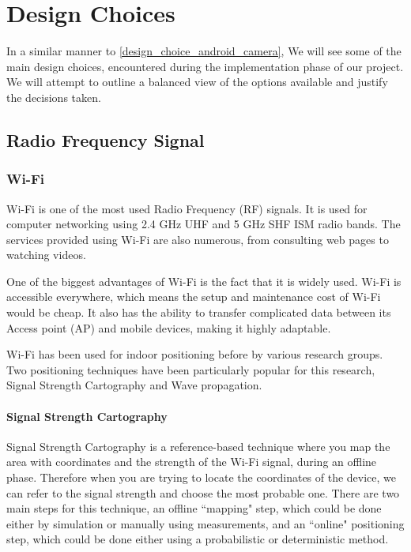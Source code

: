 

\section{Design Choices}
In a similar manner to \ref{design_choice_android_camera}, We will see some of the main design choices, encountered during the implementation phase of our project. We will attempt to outline a balanced view of the options available and justify the decisions taken.
\subsection{Radio Frequency Signal}

\subsubsection{Wi-Fi}

Wi-Fi is one of the most used Radio Frequency (RF) signals.
It is used for computer networking using 2.4 GHz UHF and 5 GHz SHF
ISM radio bands\cite{wifi-wikipedia}. The services provided using Wi-Fi are also
numerous, from consulting web pages to watching videos. 

One of the biggest advantages of Wi-Fi is the fact that it is
widely used. Wi-Fi is accessible everywhere, which means the setup and maintenance cost of Wi-Fi would be cheap. It also has the
ability to transfer complicated data between its Access point (AP)
and mobile devices, making it highly adaptable. 

Wi-Fi has been used for indoor positioning before by various research
groups\cite{wifi-indoor}. Two positioning techniques have been particularly popular for this research, Signal Strength Cartography and Wave propagation. 

\paragraph{Signal Strength Cartography}
Signal Strength Cartography\cite{sig-cart} is a reference-based technique where you map the area
with coordinates and the strength of the Wi-Fi signal, during an offline phase. Therefore when you
are trying to locate the coordinates of the device, we can refer to the signal strength and choose the most probable one. There are two main steps
for this technique, an offline ``mapping" step, which could be done either
by simulation or manually using measurements, and an ``online" positioning
step, which could be done either using a probabilistic or deterministic
method. 

